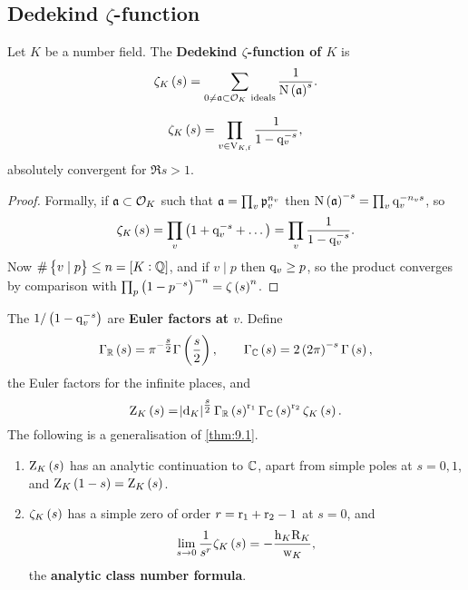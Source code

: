 \pagebreak

\subsection{Dedekind \texorpdfstring{$ \zeta $}{zeta}-function}

Let $ K $ be a number field. The \textbf{Dedekind $ \zeta $-function of $ K $} is
$$ \zeta_K\br{s} = \sum_{0 \ne \aaa \subset \OOO_K \ \text{ideals}} \dfrac{1}{\N\br{\aaa}^s}. $$

\begin{proposition}
$$ \zeta_K\br{s} = \prod_{v \in \V_{K, \f}} \dfrac{1}{1 - \q_v^{-s}}, $$
absolutely convergent for $ \Re s > 1 $.
\end{proposition}

\begin{proof}
Formally, if $ \mathfrak{a} \subset \mathcal{O}_K $ such that $ \mathfrak{a} = \prod_v \mathfrak{p}_v^{n_v} $ then $ \N\br{\aaa}^{-s} = \prod_v \q_v^{-n_vs} $, so
$$ \zeta_K\br{s} = \prod_v \br{1 + \q_v^{-s} + \dots} = \prod_v \dfrac{1}{1 - \q_v^{-s}}. $$
Now $ \#\cbr{v \mid p} \le n = \sbr{K : \QQ} $, and if $ v \mid p $ then $ \mathrm{q}_v \ge p $, so the product converges by comparison with $ \prod_p \br{1 - p^{-s}}^{-n} = \zeta\br{s}^n $.
\end{proof}

The $ 1 / \br{1 - \q_v^{-s}} $ are \textbf{Euler factors at $ v $}. Define
$$ \Gamma_\RR\br{s} = \pi^{-\tfrac{s}{2}}\Gamma\br{\dfrac{s}{2}}, \qquad \Gamma_\CC\br{s} = 2\br{2\pi}^{-s}\Gamma\br{s}, $$
the Euler factors for the infinite places, and
$$ \Z_K\br{s} = \abs{\d_K}^{\tfrac{s}{2}}\Gamma_\RR\br{s}^{\r_1}\Gamma_\CC\br{s}^{\r_2}\zeta_K\br{s}. $$
The following is a generalisation of \ref{thm:9.1}.

\begin{theorem}
\hfill
\begin{enumerate}
\item $ \Z_K\br{s} $ has an analytic continuation to $ \mathbb{C} $, apart from simple poles at $ s = 0, 1 $, and $ \Z_K\br{1 - s} = \Z_K\br{s} $.
\item $ \zeta_K\br{s} $ has a simple zero of order $ r = \mathrm{r}_1 + \mathrm{r}_2 - 1 $ at $ s = 0 $, and
\begin{equation}
\label{eq:8}
\lim_{s \to 0} \dfrac{1}{s^r}\zeta_K\br{s} = -\dfrac{\h_K\R_K}{\w_K},
\end{equation}
the \textbf{analytic class number formula}.
\end{enumerate}
\end{theorem}

